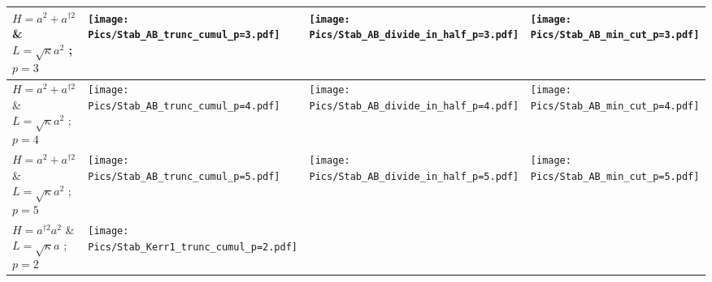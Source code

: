 \begin{landscape}
\begin{longtable}{|p{3cm}|p{7.2cm}|p{7.2cm}|p{7.2cm}|}
    $H=a^2+a^{\dagger 2}$ \& $L = \sqrt{\kappa} a^2$ ; $p=3$ &
    \begin{minipage}{7cm}
        \centering
        \texttt{[image: Pics/Stab\_AB\_trunc\_cumul\_p=3.pdf]}
    \end{minipage}&
    \begin{minipage}{7cm}
            \centering
            \texttt{[image: Pics/Stab\_AB\_divide\_in\_half\_p=3.pdf]}
        \end{minipage}&
    \begin{minipage}{7cm}
        \centering
        \texttt{[image: Pics/Stab\_AB\_min\_cut\_p=3.pdf]}
    \end{minipage}\\
    \hline
    $H=a^2+a^{\dagger 2}$ \& $L = \sqrt{\kappa} a^2$ ; $p=4$ &
    \begin{minipage}{7cm}
        \centering
        \texttt{[image: Pics/Stab\_AB\_trunc\_cumul\_p=4.pdf]}
    \end{minipage}&
    \begin{minipage}{7cm}
            \centering
            \texttt{[image: Pics/Stab\_AB\_divide\_in\_half\_p=4.pdf]}
        \end{minipage}&
    \begin{minipage}{7cm}
        \centering
        \texttt{[image: Pics/Stab\_AB\_min\_cut\_p=4.pdf]}
    \end{minipage}\\
    \hline
    $H=a^2+a^{\dagger 2}$ \& $L = \sqrt{\kappa} a^2$ ; $p=5$ &
    \begin{minipage}{7cm}
        \centering
        \texttt{[image: Pics/Stab\_AB\_trunc\_cumul\_p=5.pdf]}
    \end{minipage}&
    \begin{minipage}{7cm}
            \centering
            \texttt{[image: Pics/Stab\_AB\_divide\_in\_half\_p=5.pdf]}
        \end{minipage}&
    \begin{minipage}{7cm}
        \centering
        \texttt{[image: Pics/Stab\_AB\_min\_cut\_p=5.pdf]}
    \end{minipage}\\
    \hline
    \hline
    $H=a^{\dagger 2}a^2$ \& $L = \sqrt{\kappa} a$ ; $p=2$ &
    \begin{minipage}{7cm}
        \centering
        \texttt{[image: Pics/Stab\_Kerr1\_trunc\_cumul\_p=2.pdf]}
    \end{minipage}&
    \begin{minipage}{7cm}

\end{minipage}
\end{longtable}
\end{landscape}
